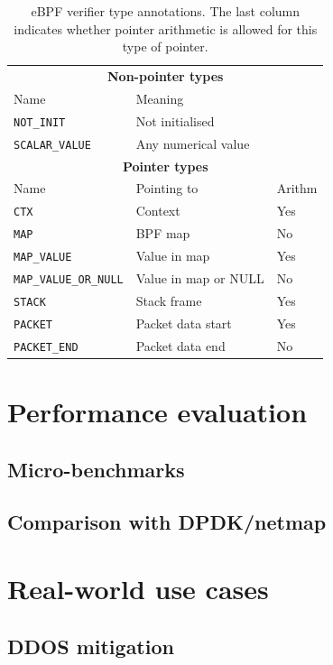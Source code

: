 \documentclass[10pt,sigconf]{acmart}
\begin{document}
\begin{table}[htbp]
\caption{\label{tbl:reg-types}
eBPF verifier type annotations. The last column indicates whether pointer arithmetic is allowed for this type of pointer.}
\centering
\begin{tabular}{lll}
\toprule
\multicolumn{3}{c}{\textbf{Non-pointer types}} \\
Name & Meaning \\
\midrule
\texttt{NOT\_INIT}            & Not initialised         \\
\texttt{SCALAR\_VALUE}        & Any numerical value       \\
\midrule
\multicolumn{3}{c}{\textbf{Pointer types}} \\
Name & Pointing to & Arithm\\
\midrule
\texttt{CTX}                  & Context              & Yes \\
\texttt{MAP}                  & BPF map              & No  \\
\texttt{MAP\_VALUE}           & Value in map         & Yes \\
\texttt{MAP\_VALUE\_OR\_NULL} & Value in map or NULL & No  \\
\texttt{STACK}                & Stack frame          & Yes \\
\texttt{PACKET}               & Packet data start    & Yes \\
\texttt{PACKET\_END}          & Packet data end      & No  \\
\bottomrule
\end{tabular}
\end{table}
\section{Performance evaluation}
\label{sec:perf-eval}
\subsection{Micro-benchmarks}
\label{sec:org72788e2}
\subsection{Comparison with DPDK/netmap}
\label{sec:org7f03063}
\section{Real-world use cases}
\label{sec:usecases}
\subsection{DDOS mitigation}
\label{sec:org5f83e1d}
\end{document}
